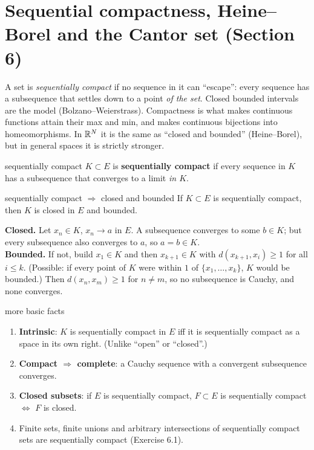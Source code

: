 \section{Sequential compactness, Heine--Borel and the Cantor set (Section 6)}

\begin{plain}
A set is \emph{sequentially compact} if no sequence in it can ``escape'': every sequence has a
subsequence that settles down to a point \emph{of the set}. Closed bounded intervals are the
model (Bolzano--Weierstrass). Compactness is what makes continuous functions attain their max and
min, and makes continuous bijections into homeomorphisms. In $\mathbb R^N$ it is the same as ``closed
and bounded'' (Heine--Borel), but in general spaces it is strictly stronger.
\end{plain}

\begin{defn}{sequentially compact}
$K\subset E$ is \textbf{sequentially compact} if every sequence in $K$ has a subsequence that
converges to a limit \emph{in $K$}.
\end{defn}

\begin{thm}{sequentially compact $\Rightarrow$ closed and bounded}
If $K\subset E$ is sequentially compact, then $K$ is closed in $E$ and bounded.
\end{thm}
\begin{answer}
\textbf{Closed.} Let $x_n\in K$, $x_n\to a$ in $E$. A subsequence converges to some $b\in K$;
but every subsequence also converges to $a$, so $a=b\in K$.\\
\textbf{Bounded.} If not, build $x_1\in K$ and then $x_{k+1}\in K$ with $d(x_{k+1},x_i)\ge1$ for
all $i\le k$. (Possible: if every point of $K$ were within $1$ of $\{x_1,\dots,x_k\}$, $K$ would
be bounded.) Then $d(x_n,x_m)\ge1$ for $n\ne m$, so no subsequence is Cauchy, and none converges.
\end{answer}

\begin{thm}{more basic facts}
\begin{enumerate}
\item \textbf{Intrinsic}: $K$ is sequentially compact in $E$ iff it is sequentially compact as a
  space in its own right. (Unlike ``open'' or ``closed''.)
\item \textbf{Compact $\Rightarrow$ complete}: a Cauchy sequence with a convergent subsequence
  converges.
\item \textbf{Closed subsets}: if $E$ is sequentially compact, $F\subset E$ is sequentially
  compact $\iff$ $F$ is closed.
\item Finite sets, finite unions and arbitrary intersections of sequentially compact sets
  are sequentially compact (Exercise 6.1).
\end{enumerate}
\end{thm}

